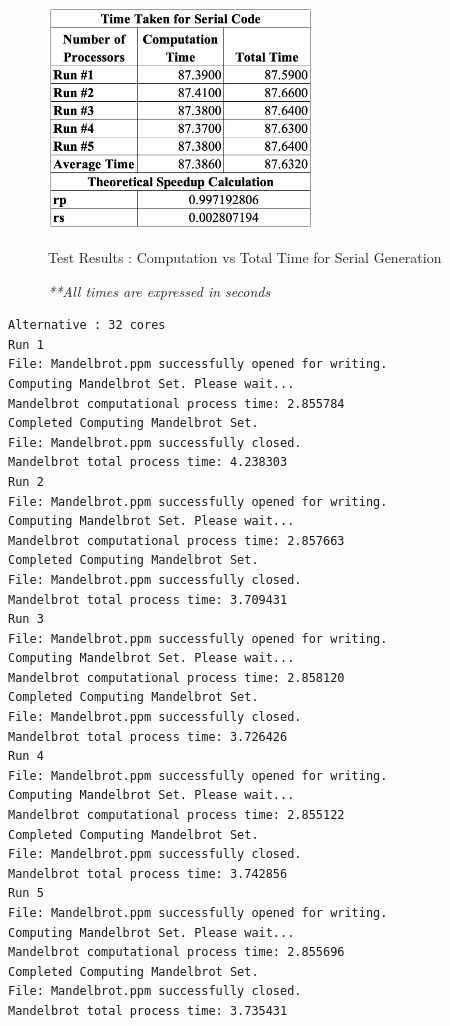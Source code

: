 \documentclass[conference]{IEEEtran}
\begin{document}
	



	\newpage
	\onecolumn
	\appendix
		\begin{figure}[h]
		\centering
		\includegraphics[width=7cm,keepaspectratio]{SCal}
		\caption{Test Results : Computation vs Total Time for Serial Generation}
		\label{app:amdal}
		\caption*{\emph{**All times are expressed in seconds}}
	\end{figure}
\begin{lstlisting}[language={}, caption={Sample MonARCH output file for 32 cores},label={32out}]
Alternative : 32 cores
Run 1
File: Mandelbrot.ppm successfully opened for writing.
Computing Mandelbrot Set. Please wait...
Mandelbrot computational process time: 2.855784
Completed Computing Mandelbrot Set.
File: Mandelbrot.ppm successfully closed.
Mandelbrot total process time: 4.238303
Run 2
File: Mandelbrot.ppm successfully opened for writing.
Computing Mandelbrot Set. Please wait...
Mandelbrot computational process time: 2.857663
Completed Computing Mandelbrot Set.
File: Mandelbrot.ppm successfully closed.
Mandelbrot total process time: 3.709431
Run 3
File: Mandelbrot.ppm successfully opened for writing.
Computing Mandelbrot Set. Please wait...
Mandelbrot computational process time: 2.858120
Completed Computing Mandelbrot Set.
File: Mandelbrot.ppm successfully closed.
Mandelbrot total process time: 3.726426
Run 4
File: Mandelbrot.ppm successfully opened for writing.
Computing Mandelbrot Set. Please wait...
Mandelbrot computational process time: 2.855122
Completed Computing Mandelbrot Set.
File: Mandelbrot.ppm successfully closed.
Mandelbrot total process time: 3.742856
Run 5
File: Mandelbrot.ppm successfully opened for writing.
Computing Mandelbrot Set. Please wait...
Mandelbrot computational process time: 2.855696
Completed Computing Mandelbrot Set.
File: Mandelbrot.ppm successfully closed.
Mandelbrot total process time: 3.735431
\end{lstlisting}
\end{document}
